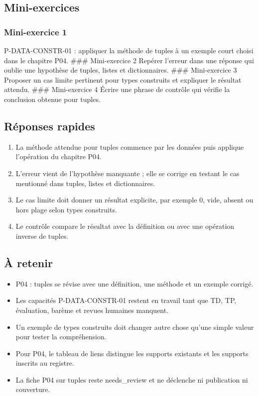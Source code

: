 \subsection{Mini-exercices}

\subsubsection{Mini-exercice 1}

P-DATA-CONSTR-01 : appliquer la méthode de tuples à un exemple court
choisi dans le chapitre P04. \#\#\# Mini-exercice 2 Repérer l'erreur
dans une réponse qui oublie une hypothèse de tuples, listes et
dictionnaires. \#\#\# Mini-exercice 3 Proposer un cas limite pertinent
pour types construits et expliquer le résultat attendu. \#\#\#
Mini-exercice 4 Écrire une phrase de contrôle qui vérifie la conclusion
obtenue pour tuples.

\subsection{Réponses rapides}

\begin{enumerate}
\def\labelenumi{\arabic{enumi}.}
\tightlist
\item
  La méthode attendue pour tuples commence par les données puis applique
  l'opération du chapitre P04.
\item
  L'erreur vient de l'hypothèse manquante ; elle se corrige en testant
  le cas mentionné dans tuples, listes et dictionnaires.
\item
  Le cas limite doit donner un résultat explicite, par exemple 0, vide,
  absent ou hors plage selon types construits.
\item
  Le contrôle compare le résultat avec la définition ou avec une
  opération inverse de tuples.
\end{enumerate}

\subsection{À retenir}

\begin{itemize}
\tightlist
\item
  P04 : tuples se révise avec une définition, une méthode et un exemple
  corrigé.
\item
  Les capacités P-DATA-CONSTR-01 restent en travail tant que TD, TP,
  évaluation, barème et revues humaines manquent.
\item
  Un exemple de types construits doit changer autre chose qu'une simple
  valeur pour tester la compréhension.
\item
  Pour P04, le tableau de liens distingue les supports existants et les
  supports inscrits au registre.
\item
  La fiche P04 sur tuples reste needs\_review et ne déclenche ni
  publication ni couverture.
\end{itemize}

